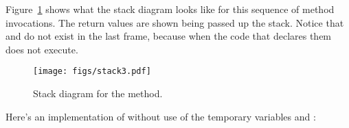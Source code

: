 Figure~\ref{fig.stack3} shows what the stack diagram looks like for this sequence of method invocations.
The return values are shown being passed up the stack.
Notice that  and  do not exist in the last frame, because when  the code that declares them does not execute.

\begin{figure}[!ht]
\begin{center}
\texttt{[image: figs/stack3.pdf]}
\caption{Stack diagram for the  method.}
\label{fig.stack3}
\end{center}
\end{figure}


%
%
%
%
%
%
%
%
Here's an implementation of  without use of the temporary variables  and :


